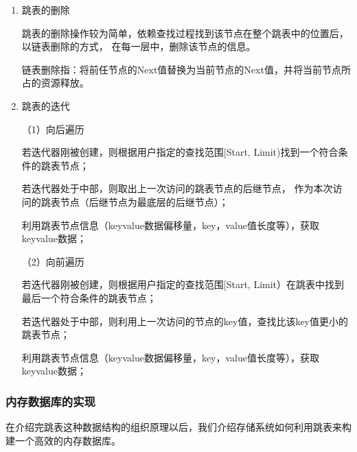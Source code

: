 \begin{enumerate}
		\item 跳表的删除

		跳表的删除操作较为简单，依赖查找过程找到该节点在整个跳表中的位置后，以链表删除的方式，
		在每一层中，删除该节点的信息。

		链表删除指：将前任节点的Next值替换为当前节点的Next值，并将当前节点所占的资源释放。

		\item 跳表的迭代
		
		（1）向后遍历

		若迭代器刚被创建，则根据用户指定的查找范围[Start, Limit)找到一个符合条件的跳表节点；
		
		若迭代器处于中部，则取出上一次访问的跳表节点的后继节点，
		作为本次访问的跳表节点（后继节点为最底层的后继节点）；
		
		利用跳表节点信息（keyvalue数据偏移量，key，value值长度等），获取keyvalue数据；
		
		（2）向前遍历

		若迭代器刚被创建，则根据用户指定的查找范围[Start, Limit）在跳表中找到最后一个符合条件的跳表节点；
		
		若迭代器处于中部，则利用上一次访问的节点的key值，查找比该key值更小的跳表节点；
		
		利用跳表节点信息（keyvalue数据偏移量，key，value值长度等），获取keyvalue数据；

	\end{enumerate}

	\subsubsection{内存数据库的实现}

		在介绍完跳表这种数据结构的组织原理以后，我们介绍存储系统如何利用跳表来构建一个高效的内存数据库。

